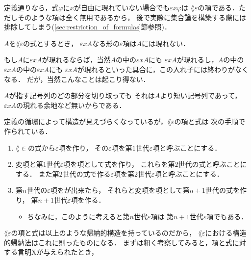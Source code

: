 	定義通りなら，式$\varphi$に$x$が自由に現れていない場合でも$\varepsilon x \varphi$は
	$\lang{\varepsilon}$の項である．ただしそのような項は全く無用であるから，
	後で実際に集合論を構築する際には排除してしまう(\ref{sec:restriction_of_formulas}節参照)．
	
	\begin{screen}
		\begin{metathm}
			$A$を$\lang{\varepsilon}$の式とするとき，
			$\varepsilon x A$なる形の$\varepsilon$項は$A$には現れない．
		\end{metathm}
	\end{screen}
	
	もし$A$に$\varepsilon x A$が現れるならば，当然$A$の中の$\varepsilon x A$にも
	$\varepsilon x A$が現れるし，$A$の中の$\varepsilon x A$の中の$\varepsilon x A$にも
	$\varepsilon x A$が現れるといった具合に，この入れ子には終わりがなくなる．
	だが，当然こんなことは起こり得ない．
	
	\begin{metaprf}
		$A$が指す記号列のどの部分を切り取っても
		それは$A$より短い記号列であって，$\varepsilon x A$の現れる余地など無いからである．
		\QED
	\end{metaprf}
	
	定義の循環によって構造が見えづらくなっているが，$\lang{\varepsilon}$の項と式は
	次の手順で作られている．
	
	\begin{enumerate}
		\item $\lang{\in}$の式から$\varepsilon$項を作り，
			その$\varepsilon$項を第$1$世代$\varepsilon$項と呼ぶことにする．
		\item 変項と第$1$世代$\varepsilon$項を項として式を作り，
			これらを第$2$世代の式と呼ぶことにする．
			また第$2$世代の式で作る$\varepsilon$項を第$2$世代$\varepsilon$項と呼ぶことにする．
		\item 第$n$世代の$\varepsilon$項をが出来たら，
			それらと変項を項として第$n+1$世代の式を作り，
			第$n+1$世代$\varepsilon$項を作る．
			
			\begin{itemize}
				\item ちなみに，このように考えると第$n$世代$\varepsilon$項は
					第$n+1$世代$\varepsilon$項でもある．
			\end{itemize}
	\end{enumerate}
	
	$\lang{\varepsilon}$の項と式は以上のような帰納的構造を持っているのだから，
	$\lang{\varepsilon}$における構造的帰納法はこれに則ったものになる．
	まずは粗く考察してみると，項と式に対する言明Xが与えられたとき，
	
